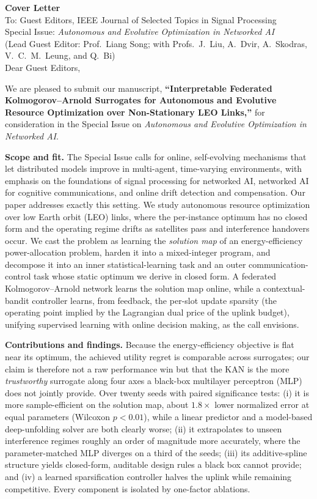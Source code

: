 \documentclass[11pt]{article}
\begin{document}
\noindent\textbf{Cover Letter}\\[2pt]
\noindent To: Guest Editors, IEEE Journal of Selected Topics in Signal Processing\\
\noindent Special Issue: \emph{Autonomous and Evolutive Optimization in Networked AI}\\
\noindent (Lead Guest Editor: Prof.\ Liang Song; with Profs.\ J.\ Liu, A.\ Dvir,
A.\ Skodras, V.\ C.\ M.\ Leung, and Q.\ Bi)\\[6pt]

\noindent Dear Guest Editors,

We are pleased to submit our manuscript, \textbf{``Interpretable Federated
Kolmogorov--Arnold Surrogates for Autonomous and Evolutive Resource Optimization
over Non-Stationary LEO Links,''} for consideration in the Special Issue on
\emph{Autonomous and Evolutive Optimization in Networked AI}.

\textbf{Scope and fit.} The Special Issue calls for online, self-evolving
mechanisms that let distributed models improve in multi-agent, time-varying
environments, with emphasis on the foundations of signal processing for networked
AI, networked AI for cognitive communications, and online drift detection and
compensation. Our paper addresses exactly this setting. We study autonomous
resource optimization over low Earth orbit (LEO) links, where the per-instance
optimum has no closed form and the operating regime drifts as satellites pass and
interference handovers occur. We cast the problem as learning the \emph{solution
map} of an energy-efficiency power-allocation problem, harden it into a
mixed-integer program, and decompose it into an inner statistical-learning task and
an outer communication-control task whose static optimum we derive in closed form.
A federated Kolmogorov--Arnold network learns the solution map online, while a
contextual-bandit controller learns, from feedback, the per-slot update sparsity
(the operating point implied by the Lagrangian dual price of the uplink budget),
unifying supervised learning with online decision making, as the call envisions.

\textbf{Contributions and findings.} Because the energy-efficiency objective is
flat near its optimum, the achieved utility regret is comparable across surrogates;
our claim is therefore not a raw performance win but that the KAN is the more
\emph{trustworthy} surrogate along four axes a black-box multilayer perceptron (MLP)
does not jointly provide. Over twenty seeds with paired significance tests: (i) it
is more sample-efficient on the solution map, about $1.8\times$ lower normalized
error at equal parameters (Wilcoxon $p<0.01$), while a linear predictor and a
model-based deep-unfolding solver are both clearly worse; (ii) it extrapolates to
unseen interference regimes roughly an order of magnitude more accurately, where the
parameter-matched MLP diverges on a third of the seeds; (iii) its additive-spline
structure yields closed-form, auditable design rules a black box cannot provide; and
(iv) a learned sparsification controller halves the uplink while remaining
competitive. Every component is isolated by one-factor ablations.
\end{document}
